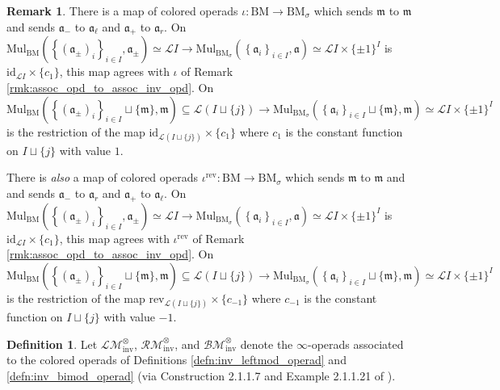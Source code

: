\documentclass{article}
\theoremstyle{definition}
\newtheorem{definition}[equation]{Definition}
\newtheorem{remark}[equation]{Remark}
\begin{document}
\begin{remark}\label{rmk:bimod_opd_to_inv_bimod_opd}
    There is a map of colored operads $ \iota \colon \mathrm{BM} \to \mathrm{BM}_{\sigma} $ which sends $ \mathfrak{m} $ to $ \mathfrak{m} $ and sends $ \mathfrak{a}_{-} $ to $ \mathfrak{a}_\ell $ and $ \mathfrak{a}_+ $ to $ \mathfrak{a}_r $. 
    On $ \mathrm{Mul}_{\mathrm{BM}}\left(\left\{(\mathfrak{a}_{\pm})_i\right\}_{i \in I}, \mathfrak{a}_{\pm}\right) \simeq  \mathcal{L}I \to \mathrm{Mul}_{\mathrm{BM}_\sigma}\left(\left\{\mathfrak{a}_i\right\}_{i \in I}, \mathfrak{a}\right) \simeq  \mathcal{L}I \times \{\pm 1\}^I $  is $ \mathrm{id}_{\mathcal{L}I} \times \{ c_1\} $, this map agrees with $ \iota $ of Remark \ref{rmk:assoc_opd_to_assoc_inv_opd}. 
    On $ \mathrm{Mul}_{\mathrm{BM}}\left(\left\{(\mathfrak{a}_{\pm})_i\right\}_{i \in I} \sqcup\{\mathfrak{m}\}, \mathfrak{m}\right) \subseteq  \mathcal{L}(I\sqcup \{j\}) \to \mathrm{Mul}_{\mathrm{BM}_\sigma}\left(\left\{\mathfrak{a}_i\right\}_{i \in I} \sqcup \{\mathfrak{m}\}, \mathfrak{m}\right) \simeq  \mathcal{L}I \times \{\pm 1\}^I $ is the restriction of the map $ \mathrm{id}_{\mathcal{L}(I\sqcup \{j\})} \times \{ c_1\} $ where $ c_1 $ is the constant function on $ I \sqcup \{j\} $ with value $ 1 $. 

    There is \emph{also} a map of colored operads $ \iota^{\mathrm{rev}} \colon \mathrm{BM} \to \mathrm{BM}_{\sigma} $ which sends $ \mathfrak{m} $ to $ \mathfrak{m} $ and  and sends $ \mathfrak{a}_{-} $ to $ \mathfrak{a}_r $ and $ \mathfrak{a}_+ $ to $ \mathfrak{a}_\ell $. 
    On $ \mathrm{Mul}_{\mathrm{BM}}\left(\left\{(\mathfrak{a}_{\pm})_i\right\}_{i \in I}, \mathfrak{a}_{\pm}\right) \simeq  \mathcal{L}I \to \mathrm{Mul}_{\mathrm{BM}_\sigma}\left(\left\{\mathfrak{a}_i\right\}_{i \in I}, \mathfrak{a}\right) \simeq  \mathcal{L}I \times \{\pm 1\}^I $  is $ \mathrm{id}_{\mathcal{L}I} \times \{ c_1\} $, this map agrees with $ \iota^{\mathrm{rev}} $ of Remark \ref{rmk:assoc_opd_to_assoc_inv_opd}. 
    On $ \mathrm{Mul}_{\mathrm{BM}}\left(\left\{(\mathfrak{a}_{\pm})_i\right\}_{i \in I} \sqcup\{\mathfrak{m}\}, \mathfrak{m}\right) \subseteq  \mathcal{L}(I\sqcup \{j\}) \to \mathrm{Mul}_{\mathrm{BM}_\sigma}\left(\left\{\mathfrak{a}_i\right\}_{i \in I} \sqcup \{\mathfrak{m}\}, \mathfrak{m}\right) \simeq  \mathcal{L}I \times \{\pm 1\}^I $ is the restriction of the map $ \mathrm{rev}_{\mathcal{L}(I\sqcup \{j\})} \times \{ c_{-1}\} $ where $ c_{-1} $ is the constant function on $ I \sqcup \{j\} $ with value $ -1 $. 
\end{remark}
\begin{definition}\label{defn:inv_leftrightbimod_infty_operad}
    Let $ \mathcal{LM}_\mathrm{inv}^\otimes $, $ \mathcal{RM}_\mathrm{inv}^\otimes $, and $ \mathcal{BM}_\mathrm{inv}^\otimes $ denote the $ \infty $-operads associated to the colored operads of Definitions \ref{defn:inv_leftmod_operad} and \ref{defn:inv_bimod_operad} (via Construction 2.1.1.7 and Example 2.1.1.21 of \cite{LurHA}).
\end{definition}
\end{document}
